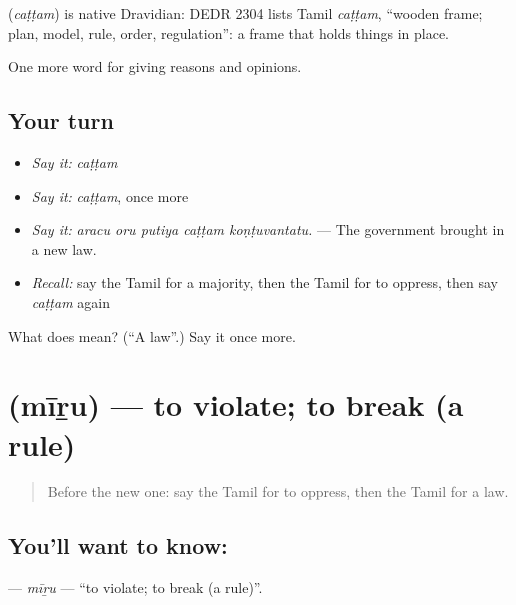 \begin{cousinweb}
\textbf{} (\emph{caṭṭam}) is native Dravidian: DEDR 2304 lists Tamil \emph{caṭṭam}, \textquotedblleft{}wooden frame; plan, model, rule, order, regulation\textquotedblright{}: a frame that holds things in place.
\end{cousinweb}

\begin{grammarlens}[title={What you've built}]
One more word for giving reasons and opinions.
\end{grammarlens}

\subsection*{Your turn}
\begin{itemize}
\raggedright
  \item \emph{Say it:} \emph{caṭṭam}
  \item \emph{Say it:} \emph{caṭṭam}, once more
  \item \emph{Say it:} \emph{aracu oru putiya caṭṭam koṇṭuvantatu.} — The government brought in a new law.
  \item \emph{Recall:} say the Tamil for a majority, then the Tamil for to oppress, then say \emph{caṭṭam} again
\end{itemize}

\begin{tcolorbox}[breakable,colback=teal!4,colframe=teal!35!black,title={Before you move on}]
What does  mean? (\textquotedblleft{}A law\textquotedblright{}.) Say it once more.
\end{tcolorbox}
\section[\texorpdfstring{\ta{மீறு} (mīṟu)}{மீறு (mīṟu)}]{ (mīṟu) — to violate; to break (a rule)}

\label{lesson:TA-C372-miru}



\begin{quote}
Before the new one: say the Tamil for to oppress, then the Tamil for a law.
\end{quote}

\subsection*{You'll want to know: }
\textbf{} — \emph{mīṟu} — \textquotedblleft{}to violate; to break (a rule)\textquotedblright{}.

